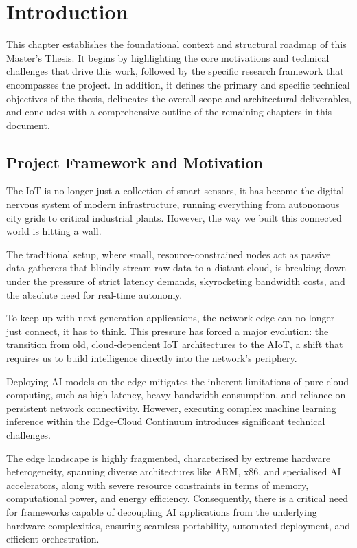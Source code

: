 \chapter{Introduction}\label{ch:introduction}

This chapter establishes the foundational context and structural roadmap of this Master's Thesis. It begins by highlighting the core motivations and technical challenges that drive this work, followed by the specific research framework that encompasses the project. In addition, it defines the primary and specific technical objectives of the thesis, delineates the overall scope and architectural deliverables, and concludes with a comprehensive outline of the remaining chapters in this document.

\section{Project Framework and Motivation}\label{sec:int:motivation} 

The \gls{IoT} is no longer just a collection of smart sensors, it has become the digital nervous system of modern infrastructure, running everything from autonomous city grids to critical industrial plants. However, the way we built this connected world is hitting a wall. 

The traditional setup, where small, resource-constrained nodes act as passive data gatherers that blindly stream raw data to a distant cloud, is breaking down under the pressure of strict latency demands, skyrocketing bandwidth costs, and the absolute need for real-time autonomy. 

To keep up with next-generation applications, the network edge can no longer just connect, it has to think. This pressure has forced a major evolution: the transition from old, cloud-dependent \gls{IoT} architectures to the \gls{AIoT}, a shift that requires us to build intelligence directly into the network's periphery.

Deploying \gls{AI} models on the edge mitigates the inherent limitations of pure cloud computing, such as high latency, heavy bandwidth consumption, and reliance on persistent network connectivity. However, executing complex machine learning inference within the Edge-Cloud Continuum introduces significant technical challenges. 

The edge landscape is highly fragmented, characterised by extreme hardware heterogeneity, spanning diverse architectures like \gls{ARM}, x86, and specialised \gls{AI} accelerators, along with severe resource constraints in terms of memory, computational power, and energy efficiency. Consequently, there is a critical need for frameworks capable of decoupling \gls{AI} applications from the underlying hardware complexities, ensuring seamless portability, automated deployment, and efficient orchestration.

